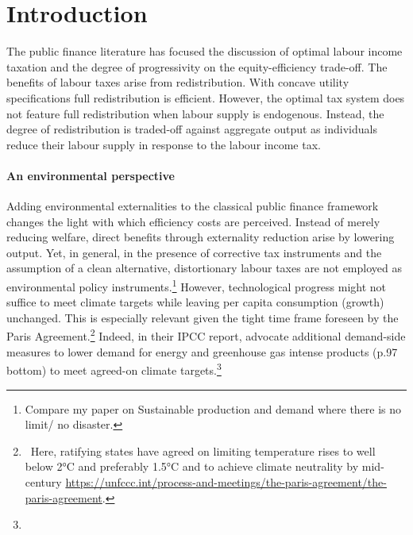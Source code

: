 
\section{Introduction}
The public finance literature has focused the discussion of optimal labour income taxation and the degree of progressivity on the equity-efficiency trade-off.  The benefits of labour taxes arise from redistribution. With concave utility specifications full redistribution is efficient. However, the optimal tax system does not feature full redistribution when labour supply is endogenous. Instead, the degree of redistribution is traded-off against aggregate output as individuals reduce their labour supply in response to the labour income tax. 

\paragraph{An environmental perspective}

 Adding environmental externalities to the classical public finance framework changes the light with which efficiency costs are perceived. Instead of merely reducing welfare, direct benefits through externality reduction arise by lowering output. 
Yet, in general, in the presence of corrective tax instruments and the assumption of a clean alternative, %
distortionary labour taxes are not employed as environmental policy instruments.\footnote{ Compare my paper on Sustainable production and demand where there is no limit/ no disaster.} 
However, technological progress might not suffice to meet climate targets while leaving per capita consumption (growth) unchanged. This is especially relevant given the tight time frame foreseen by the Paris Agreement.\footnote{\ Here, ratifying states have agreed on limiting temperature rises to well below 2°C and preferably 1.5°C and to achieve climate neutrality by mid-century \url{https://unfccc.int/process-and-meetings/the-paris-agreement/the-paris-agreement}. } Indeed, in their IPCC report, \cite{Rogelj2018MitigationDevelopment.} advocate additional demand-side measures to lower demand for energy and greenhouse gas intense products (p.97 bottom) to meet agreed-on climate targets.\footnote{}

